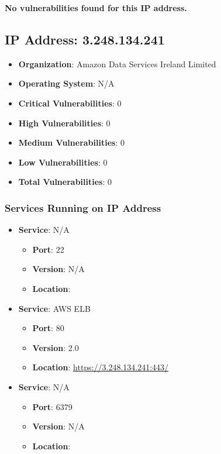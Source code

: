 \documentclass{article}
\begin{document}
\textbf{No vulnerabilities found for this IP address.}




\clearpage



\subsection{IP Address: 3.248.134.241}

\begin{itemize}
    \item \textbf{Organization}: Amazon Data Services Ireland Limited
    \item \textbf{Operating System}:  N/A 
    \item \textbf{Critical Vulnerabilities}: 0
    \item \textbf{High Vulnerabilities}: 0
    \item \textbf{Medium Vulnerabilities}: 0
    \item \textbf{Low Vulnerabilities}: 0
    \item \textbf{Total Vulnerabilities}: 0
\end{itemize}

\subsubsection*{Services Running on IP Address}

\begin{itemize}
    
        \item \textbf{Service}: N/A
        \begin{itemize}
            \item \textbf{Port}: 22
            \item \textbf{Version}:  N/A 
            \item \textbf{Location}: \href{  }{  }
        \end{itemize}
    
        \item \textbf{Service}: AWS ELB
        \begin{itemize}
            \item \textbf{Port}: 80
            \item \textbf{Version}:  2.0 
            \item \textbf{Location}: \href{ https://3.248.134.241:443/ }{ https://3.248.134.241:443/ }
        \end{itemize}
    
        \item \textbf{Service}: N/A
        \begin{itemize}
            \item \textbf{Port}: 6379
            \item \textbf{Version}:  N/A 
            \item \textbf{Location}: \href{  }{  }
        \end{itemize}
    
\end{itemize}
\end{document}
